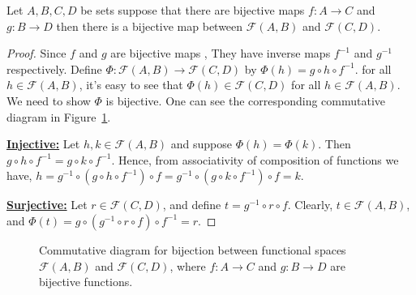 \documentclass[a4paper,english,12pt]{article}   	%
\begin{document}
\begin{lem}
Let $A,B,C,D$ be sets suppose that there are bijective maps $f \colon A \to C$ and $g \colon B \to D$ then there is a bijective map between $\mathcal{F}(A,B)$ and $ \mathcal{F}(C,D)$.
\end{lem}
\begin{proof} Since $f$ and $g$ are bijective maps , They have inverse maps $f^{-1}$ and $g^{-1}$ respectively.
Define $\Phi \colon \mathcal{F}(A,B) \to \mathcal{F}(C,D)$ by $\Phi (h) = g \circ h \circ f^{-1}$. for all $h \in \mathcal{F}(A,B)$, it's easy to see that $\Phi (h) \in \mathcal{F}(C,D)$ for all $h \in \mathcal{F}(A,B)$. We need to show $\Phi$ is bijective. One can see the corresponding commutative diagram in Figure~\ref{Fig:CommDiagBij}.

\underline{\textbf{Injective:}} Let $h,k \in \mathcal{F}(A,B)$ and suppose $\Phi (h)=\Phi (k)$. Then $g \circ h \circ f^{-1} = g \circ k \circ f^{-1}$. Hence, from associativity of composition of functions we have, $h = g^{-1} \circ ( g \circ h \circ f^{-1}) \circ f = g^{-1} \circ ( g \circ k \circ f^{-1} ) \circ f = k$.

\underline{\textbf{Surjective:}} Let $r \in \mathcal{F}(C,D)$, and define $t = g^{-1} \circ r \circ f$. Clearly, $t \in \mathcal{F}(A,B)$, and $\Phi(t) = g \circ (g^{-1} \circ r \circ f) \circ f^{-1} = r$.
\end{proof}
\begin{figure}[hhhh]
\centering
\scalebox{1}{}
\caption{Commutative diagram for bijection between functional spaces $\mathcal{F}(A,B)$ and $ \mathcal{F}(C,D)$, where $f:A \to C$ and $g: B \to D$ are bijective functions.}
\label{Fig:CommDiagBij}
\end{figure}
\end{document}
